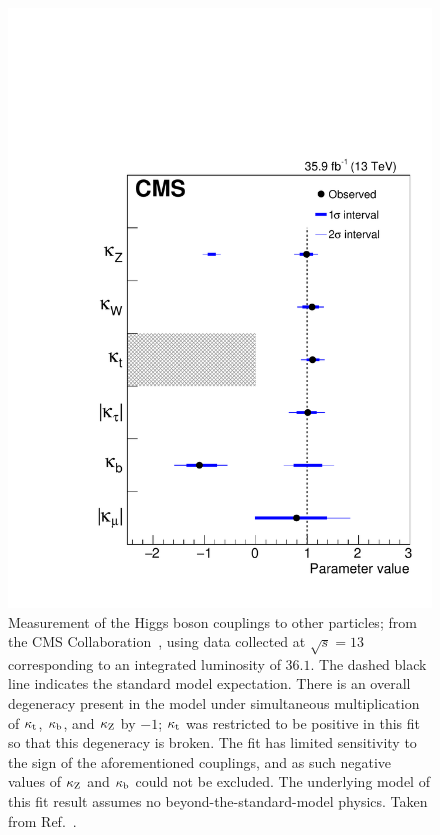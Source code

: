 \begin{figure}[hbtp]
  \begin{center}
    \includegraphics[width=\halflinewidth]{img/cmscombcouplings.pdf}
    \caption{%
        Measurement of the Higgs boson couplings to other particles; from the CMS Collaboration~\cite{Sirunyan:2018koj}, using data collected at $\sqrt{s}=13$\TeV corresponding to an integrated luminosity of $36.1$\fbinv.
        The dashed black line indicates the standard model expectation.
        There is an overall degeneracy present in the model under simultaneous multiplication of $\kappa_{\mathrm{t}}$, $\kappa_{\mathrm{b}}$, and $\kappa_{\mathrm{Z}}$ by $-1$; $\kappa_{\mathrm{t}}$ was restricted to be positive in this fit so that this degeneracy is broken.
        The fit has limited sensitivity to the sign of the aforementioned couplings, and as such negative values of $\kappa_{\mathrm{Z}}$ and $\kappa_{\mathrm{b}}$ could not be excluded.
        The underlying model of this fit result assumes no beyond-the-standard-model physics.
        Taken from Ref.~\cite{Sirunyan:2018koj}.
        }
    \label{fig:productiondecay}
  \end{center}
\end{figure}


